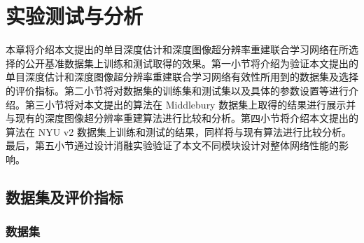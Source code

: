 \chapter{实验测试与分析}

本章将介绍本文提出的单目深度估计和深度图像超分辨率重建联合学习网络在所选择的公开基准数据集上训练和测试取得的效果。第一小节将介绍为验证本文提出的单目深度估计和深度图像超分辨率重建联合学习网络有效性所用到的数据集及选择的评价指标。第二小节将对数据集的训练集和测试集以及具体的参数设置等进行介绍。第三小节将对本文提出的算法在 Middlebury 数据集上取得的结果进行展示并与现有的深度图像超分辨率重建算法进行比较和分析。第四小节将介绍本文提出的算法在 NYU v2 数据集上训练和测试的结果，同样将与现有算法进行比较分析。最后，第五小节通过设计消融实验验证了本文不同模块设计对整体网络性能的影响。

\section{数据集及评价指标}

\subsection{数据集}

